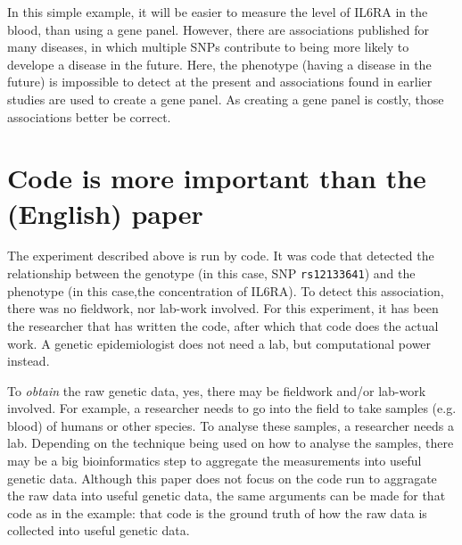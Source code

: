 In this simple example, it will be easier
to measure the level of IL6RA in the blood, than using a gene panel.
However, there are associations published for many diseases,
in which multiple SNPs contribute to being more likely 
to develope a disease in the future. Here, the phenotype (having 
a disease in the future) is impossible to detect at the present
and associations found in earlier studies are used to create a gene panel.
As creating a gene panel is costly, those associations better be correct.

\section{Code is more important than the (English) paper}


The experiment described above is run by code. 
It was code that detected the relationship between the genotype
(in this case, SNP \verb|rs12133641|) 
and the phenotype (in this case,the concentration of IL6RA).
To detect this association, 
there was no fieldwork, nor lab-work involved.
For this experiment, 
it has been the researcher that has written the code,
after which that code does the actual work. 
A genetic epidemiologist does not need a lab, but computational power instead.

To \emph{obtain} the raw genetic data, yes, there may be fieldwork and/or lab-work
involved. For example, a researcher needs to go into the field to take
samples (e.g. blood) of humans or other species. To analyse these samples,
a researcher needs a lab. Depending on the technique being used on
how to analyse the samples, there may be a big bioinformatics step
to aggregate the measurements into useful genetic data. 
Although this paper does not focus on the code run to 
aggragate the raw data into useful genetic data, the same arguments
can be made for that code as in the example: that code is 
the ground truth of how the raw data is collected into useful genetic data.


